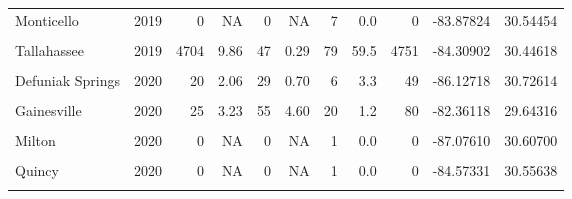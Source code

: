 \documentclass[12pt,final,CPage]{ufthesis}
\begin{document}
{\begin{table}[!h]
{\begin{tabular}[t]{lrrrrrrrrrr}
  Monticello & 2019 & 0 & NA & 0 & NA & 7 & 0.0 & 0 & -83.87824 & 30.54454\\
  \addlinespace
  \cellcolor{gray!6}{Quincy} & \cellcolor{gray!6}{2019} & \cellcolor{gray!6}{0} & \cellcolor{gray!6}{0.00} & \cellcolor{gray!6}{9} & \cellcolor{gray!6}{1.13} & \cellcolor{gray!6}{7} & \cellcolor{gray!6}{0.0} & \cellcolor{gray!6}{9} & \cellcolor{gray!6}{-84.60175} & \cellcolor{gray!6}{30.56986}\\
  Tallahassee & 2019 & 4704 & 9.86 & 47 & 0.29 & 79 & 59.5 & 4751 & -84.30902 & 30.44618\\
  \cellcolor{gray!6}{Baldwin} & \cellcolor{gray!6}{2020} & \cellcolor{gray!6}{27} & \cellcolor{gray!6}{1.31} & \cellcolor{gray!6}{15} & \cellcolor{gray!6}{1.55} & \cellcolor{gray!6}{4} & \cellcolor{gray!6}{6.8} & \cellcolor{gray!6}{42} & \cellcolor{gray!6}{-81.97352} & \cellcolor{gray!6}{30.30268}\\
  Defuniak Springs & 2020 & 20 & 2.06 & 29 & 0.70 & 6 & 3.3 & 49 & -86.12718 & 30.72614\\
  \cellcolor{gray!6}{Ferry Pass} & \cellcolor{gray!6}{2020} & \cellcolor{gray!6}{0} & \cellcolor{gray!6}{NA} & \cellcolor{gray!6}{0} & \cellcolor{gray!6}{NA} & \cellcolor{gray!6}{2} & \cellcolor{gray!6}{0.0} & \cellcolor{gray!6}{0} & \cellcolor{gray!6}{-87.21893} & \cellcolor{gray!6}{30.54415}\\
  \addlinespace
  Gainesville & 2020 & 25 & 3.23 & 55 & 4.60 & 20 & 1.2 & 80 & -82.36118 & 29.64316\\
  \cellcolor{gray!6}{Jacksonville} & \cellcolor{gray!6}{2020} & \cellcolor{gray!6}{66} & \cellcolor{gray!6}{1.13} & \cellcolor{gray!6}{41} & \cellcolor{gray!6}{1.67} & \cellcolor{gray!6}{8} & \cellcolor{gray!6}{8.2} & \cellcolor{gray!6}{107} & \cellcolor{gray!6}{-81.68811} & \cellcolor{gray!6}{30.39848}\\
  Milton & 2020 & 0 & NA & 0 & NA & 1 & 0.0 & 0 & -87.07610 & 30.60700\\
  \cellcolor{gray!6}{Orlando} & \cellcolor{gray!6}{2020} & \cellcolor{gray!6}{0} & \cellcolor{gray!6}{NA} & \cellcolor{gray!6}{0} & \cellcolor{gray!6}{NA} & \cellcolor{gray!6}{4} & \cellcolor{gray!6}{0.0} & \cellcolor{gray!6}{0} & \cellcolor{gray!6}{-81.51605} & \cellcolor{gray!6}{28.50670}\\
  Quincy & 2020 & 0 & NA & 0 & NA & 1 & 0.0 & 0 & -84.57331 & 30.55638\\
  \addlinespace
  \cellcolor{gray!6}{Tallahassee} & \cellcolor{gray!6}{2020} & \cellcolor{gray!6}{3364} & \cellcolor{gray!6}{4.82} & \cellcolor{gray!6}{1150} & \cellcolor{gray!6}{0.79} & \cellcolor{gray!6}{157} & \cellcolor{gray!6}{21.4} & \cellcolor{gray!6}{4514} & \cellcolor{gray!6}{-84.30878} & \cellcolor{gray!6}{30.44297}\\

\end{tabular}}
\end{table}}
\end{document}
